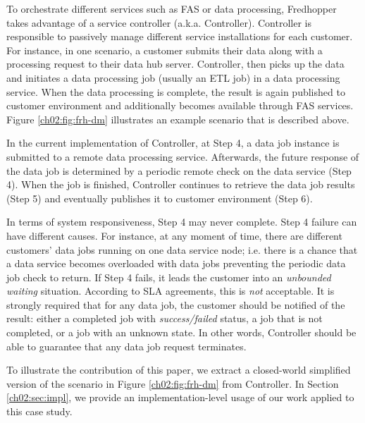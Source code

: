 To orchestrate different services such as FAS or data processing, Fredhopper takes advantage of a service controller (a.k.a. Controller).
Controller is responsible to passively manage different service installations for each customer.
For instance, in one scenario, a customer submits their data along with a processing request to their data hub server.
Controller, then picks up the data and initiates a data processing job (usually an ETL job) in a data processing service.
When the data processing is complete, the result is again published to customer environment and additionally becomes available through FAS services.
Figure \ref{ch02:fig:frh-dm} illustrates an example scenario that is described above.

In the current implementation of Controller, at Step 4, a data job instance is submitted to a remote data processing service.
Afterwards, the future response of the data job is determined by a periodic remote check on the data service (Step 4). 
When the job is finished, Controller continues to retrieve the data job results (Step 5) and eventually publishes it to customer environment (Step 6).

In terms of system responsiveness, Step 4 may never complete. 
Step 4 failure can have different causes. 
For instance, at any moment of time, there are different customers' data jobs running on one data service node;
i.e. there is a chance that a data service becomes overloaded with data jobs preventing the periodic data job check to return.
If Step 4 fails, it leads the customer into an \emph{unbounded waiting} situation.
According to SLA agreements, this is \emph{not} acceptable.
It is strongly required that for any data job, the customer should be notified of the result: either a completed job with \textsl{success/failed} status, a job that is not completed, or a job with an unknown state.
In other words, Controller should be able to guarantee that any data job request terminates.

To illustrate the contribution of this paper, we extract a closed-world simplified version of the scenario in Figure \ref{ch02:fig:frh-dm} from Controller.
In Section \ref{ch02:sec:impl}, we provide an implementation-level usage of our work applied to this case study.

